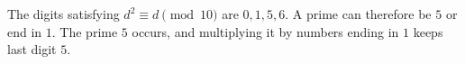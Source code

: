 The digits satisfying $d^2\equiv d\pmod{10}$ are $0,1,5,6$. A prime can therefore be $5$ or end in $1$. The prime $5$ occurs, and multiplying it by numbers ending in $1$ keeps last digit $\boxed5$.
